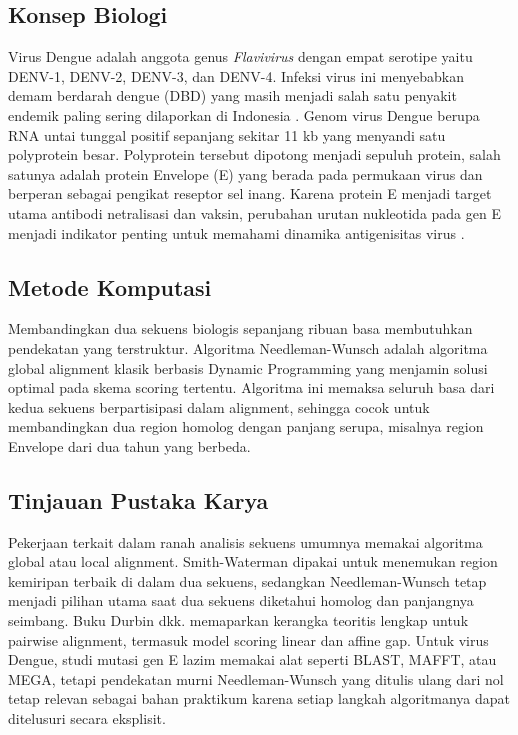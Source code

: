 \documentclass[conference]{IEEEtran}
\begin{document}
\subsection{Konsep Biologi}
Virus Dengue adalah anggota genus \textit{Flavivirus} dengan empat serotipe yaitu DENV-1, DENV-2, DENV-3, dan DENV-4. Infeksi virus ini menyebabkan demam berdarah dengue (DBD) yang masih menjadi salah satu penyakit endemik paling sering dilaporkan di Indonesia \cite{kemenkes2023}. Genom virus Dengue berupa RNA untai tunggal positif sepanjang sekitar 11 kb yang menyandi satu polyprotein besar. Polyprotein tersebut dipotong menjadi sepuluh protein, salah satunya adalah protein Envelope (E) yang berada pada permukaan virus dan berperan sebagai pengikat reseptor sel inang. Karena protein E menjadi target utama antibodi netralisasi dan vaksin, perubahan urutan nukleotida pada gen E menjadi indikator penting untuk memahami dinamika antigenisitas virus \cite{guzman2016}.

\subsection{Metode Komputasi}
Membandingkan dua sekuens biologis sepanjang ribuan basa membutuhkan pendekatan yang terstruktur. Algoritma Needleman-Wunsch \cite{needleman1970} adalah algoritma global alignment klasik berbasis Dynamic Programming yang menjamin solusi optimal pada skema scoring tertentu. Algoritma ini memaksa seluruh basa dari kedua sekuens berpartisipasi dalam alignment, sehingga cocok untuk membandingkan dua region homolog dengan panjang serupa, misalnya region Envelope dari dua tahun yang berbeda.

\subsection{Tinjauan Pustaka Karya}
Pekerjaan terkait dalam ranah analisis sekuens umumnya memakai algoritma global atau local alignment. Smith-Waterman \cite{smith1981} dipakai untuk menemukan region kemiripan terbaik di dalam dua sekuens, sedangkan Needleman-Wunsch tetap menjadi pilihan utama saat dua sekuens diketahui homolog dan panjangnya seimbang. Buku Durbin dkk. \cite{durbin1998} memaparkan kerangka teoritis lengkap untuk pairwise alignment, termasuk model scoring linear dan affine gap. Untuk virus Dengue, studi mutasi gen E lazim memakai alat seperti BLAST, MAFFT, atau MEGA, tetapi pendekatan murni Needleman-Wunsch yang ditulis ulang dari nol tetap relevan sebagai bahan praktikum karena setiap langkah algoritmanya dapat ditelusuri secara eksplisit.
\end{document}
